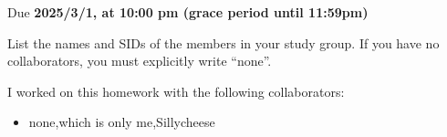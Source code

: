 \documentclass[11pt]{article}
\def\duedate{2025/3/1, at 10:00 pm (grace period until 11:59pm)}
\begin{document}
\maketitle
Due \textbf{\duedate}


List the names and SIDs of the members in your study group.
If you have no collaborators, you must explicitly write ``none''.

\begin{solution} I worked on this homework with the following collaborators:
\begin{itemize}
    \item none,which is only me,Sillycheese
\end{itemize}
\end{solution}

\end{document}
